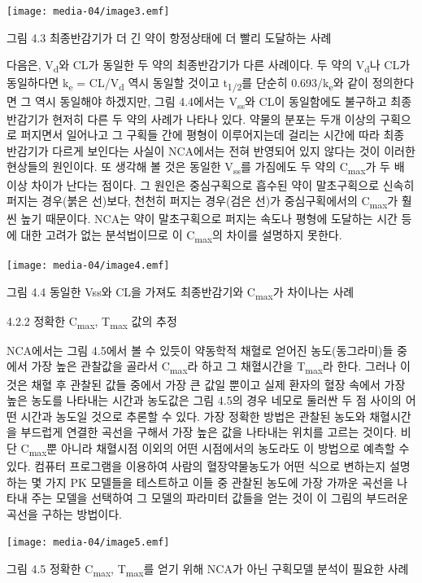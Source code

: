 \documentclass[
  11pt,
  krantz2, a4paper, twoside]{krantz}
\begin{document}
\texttt{[image: media-04/image3.emf]}

그림 4.3 최종반감기가 더 긴 약이 항정상태에 더 빨리 도달하는 사례

다음은, V\textsubscript{d}와 CL가 동일한 두 약의 최종반감기가 다른 사례이다. 두 약의
V\textsubscript{d}나 CL가 동일하다면 k\textsubscript{e} = CL/V\textsubscript{d} 역시 동일할 것이고 t\textsubscript{1/2}를 단순히
0.693/k\textsubscript{e}와 같이 정의한다면 그 역시 동일해야 하겠지만, 그림 4.4에서는
V\textsubscript{ss}와 CL이 동일함에도 불구하고 최종반감기가 현저히 다른 두 약의 사례가
나타나 있다. 약물의 분포는 두개 이상의 구획으로 퍼지면서 일어나고 그
구획들 간에 평형이 이루어지는데 걸리는 시간에 따라 최종 반감기가 다르게
보인다는 사실이 NCA에서는 전혀 반영되어 있지 않다는 것이 이러한 현상들의
원인이다. 또 생각해 볼 것은 동일한 V\textsubscript{ss}를 가짐에도 두 약의 C\textsubscript{max}가 두
배 이상 차이가 난다는 점이다. 그 원인은 중심구획으로 흡수된 약이
말초구획으로 신속히 퍼지는 경우(붉은 선)보다, 천천히 퍼지는 경우(검은
선)가 중심구획에서의 C\textsubscript{max}가 훨씬 높기 때문이다. NCA는 약이
말초구획으로 퍼지는 속도나 평형에 도달하는 시간 등에 대한 고려가 없는
분석법이므로 이 C\textsubscript{max}의 차이를 설명하지 못한다.

\texttt{[image: media-04/image4.emf]}

그림 4.4 동일한 Vss와 CL을 가져도 최종반감기와 C\textsubscript{max}가 차이나는 사례

4.2.2 정확한 C\textsubscript{max}, T\textsubscript{max} 값의 추정

NCA에서는 그림 4.5에서 볼 수 있듯이 약동학적 채혈로 얻어진
농도(동그라미)들 중에서 가장 높은 관찰값을 골라서 C\textsubscript{max}라 하고 그
채혈시간을 T\textsubscript{max}라 한다. 그러나 이것은 채혈 후 관찰된 값들 중에서 가장
큰 값일 뿐이고 실제 환자의 혈장 속에서 가장 높은 농도를 나타내는 시간과
농도값은 그림 4.5의 경우 네모로 둘러싼 두 점 사이의 어떤 시간과 농도일
것으로 추론할 수 있다. 가장 정확한 방법은 관찰된 농도와 채혈시간을
부드럽게 연결한 곡선을 구해서 가장 높은 값을 나타내는 위치를 고르는
것이다. 비단 C\textsubscript{max}뿐 아니라 채혈시점 이외의 어떤 시점에서의 농도라도 이
방법으로 예측할 수 있다. 컴퓨터 프로그램을 이용하여 사람의
혈장약물농도가 어떤 식으로 변하는지 설명하는 몇 가지 PK 모델들을
테스트하고 이들 중 관찰된 농도에 가장 가까운 곡선을 나타내 주는 모델을
선택하여 그 모델의 파라미터 값들을 얻는 것이 이 그림의 부드러운 곡선을
구하는 방법이다.

\texttt{[image: media-04/image5.emf]}

그림 4.5 정확한 C\textsubscript{max}, T\textsubscript{max}를 얻기 위해 NCA가 아닌 구획모델 분석이
필요한 사례
\end{document}

